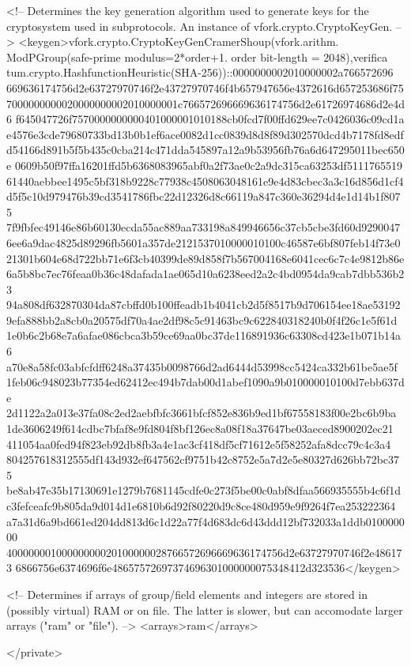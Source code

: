    <!-- Determines the key generation algorithm used to generate keys 
        for the cryptosystem used in subprotocols. An instance of 
        vfork.crypto.CryptoKeyGen. -->
   <keygen>vfork.crypto.CryptoKeyGenCramerShoup(vfork.arithm.
ModPGroup(safe-prime modulus=2*order+1. order bit-length = 2048),verifica
tum.crypto.HashfunctionHeuristic(SHA-256))::0000000002010000002a766572696
669636174756d2e63727970746f2e43727970746f4b657947656e4372616d657253686f75
7000000000020000000002010000001c766572696669636174756d2e61726974686d2e4d6
f645047726f7570000000000401000001010188cb0fcd7f00ffd629ee7c0426036c09cd1a
e4576e3cde79680733bd13b0b1ef6ace0082d1cc0839d8d8f89d302570dcd4b7178fd8edf
d54166d891b5f5b435c0cba214c471dda545897a12a9b53956fb76a6d647295011bec650e
0609b50f97ffa16201ffd5b6368083965abf0a2f73ae0c2a9dc315ca63253df5111765519
61440aebbee1495c5bf318b9228c77938c4508063048161e9e4d83cbec3a3c16d856d1cf4
d5f5c10d979476b39cd3541786fbc22d12326d8c66119a847c360e36294d4e1d14b1f8075
7f9fbfec49146e86b60130ecda55ac889aa733198a849946656c37cb5cbe3fd60d9290047
6ee6a9dac4825d89296fb5601a357de2121537010000010100c46587e6bf807feb14f73e0
21301b604e68d722bb71e6f3cb40399de89d858f7b567004168e6041cec6c7c4e9812b86e
6a5b8bc7ec76feaa0b36c48dafada1ae065d10a6238eed2a2c4bd0954da9cab7dbb536b23
94a808df632870304da87cbffd0b100ffeadb1b4041cb2d5f8517b9d706154ee18ae53192
9efa888bb2a8cb0a20575df70a4ae2df98c5c91463bc9c622840318240b0f4f26c1e5f61d
1e0b6c2b68e7a6afae086cbca3b59ce69aa0bc37de116891936c63308cd423e1b071b14a6
a70e8a58fc03abfcfdff6248a37435b0098766d2ad6444d53998cc5424ca332b61be5ae5f
1feb06c948023b77354ed62412ec494b7dab00d1abef1090a9b010000010100d7ebb637de
2d1122a2a013e37fa08c2ed2aebfbfc3661bfcf852e836b9ed1bf67558183f00e2bc6b9ba
1de3606249f614cdbc7bfaf8e9fd804f8bf126ec8a08f18a37647be03aeced8900202ec21
411054aa0fed94f823eb92db8fb3a4e1ac3cf418df5cf71612e5f58252afa8dcc79c4c3a4
804257618312555df143d932ef647562cf9751b42c8752e5a7d2e5e80327d626bb72bc375
be8ab47e35b17130691e1279b7681145cdfe0c273f5be00c0abf8dfaa566935555b4c6f1d
c3fefceafc9b805da9d014d1e6810b6d92f80220d9c8ce480d959e9f9264f7ea253222364
a7a31d6a9bd661ed204dd813d6c1d22a77f4d683dc6d43ddd12bf732033a1ddb010000000
40000000100000000020100000028766572696669636174756d2e63727970746f2e486173
6866756e6374696f6e48657572697374696301000000075348412d323536</keygen>

   <!-- Determines if arrays of group/field elements and integers are 
        stored in (possibly virtual) RAM or on file. The latter is 
        slower, but can accomodate larger arrays ("ram" or "file"). -->
   <arrays>ram</arrays>

</private>

